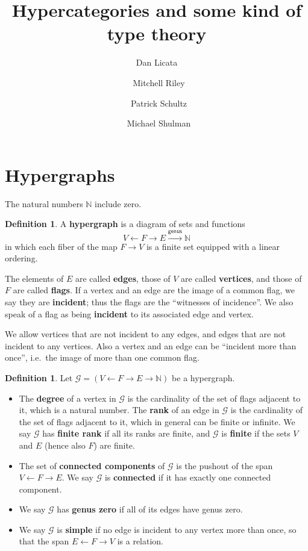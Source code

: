 \documentclass{article}
\title{Hypercategories and some kind of type theory}
\author{Dan Licata \and\ Mitchell Riley \and\ Patrick Schultz \and\ Michael Shulman}
\theoremstyle{definition}
\newtheorem{defn}[thm]{Definition}
\theoremstyle{remark}
\def\G{\mathcal{G}}
\let\ot\leftarrow
\let\xto\xrightarrow
\def\genus{\mathsf{genus}}
\def\N{\mathbb{N}}
\begin{document}
\maketitle

\section{Hypergraphs}
\label{sec:hypergraphs}

The natural numbers $\N$ include zero.

\begin{defn}
  A \textbf{hypergraph} is a diagram of sets and functions
  \[ V \ot F \to E \xto{\genus} \N\]
  in which each fiber of the map $F\to V$ is a finite set equipped with a linear ordering.

  The elements of $E$ are called \textbf{edges}, those of $V$ are called \textbf{vertices}, and those of $F$ are called \textbf{flags}.
  If a vertex and an edge are the image of a common flag, we say they are \textbf{incident}; thus the flags are the ``witnesses of incidence''.
  We also speak of a flag as being \textbf{incident} to its associated edge and vertex.
\end{defn}

We allow vertices that are not incident to any edges, and edges that are not incident to any vertices.
Also a vertex and an edge can be ``incident more than once'', i.e.\ the image of more than one common flag.

\begin{defn}
  Let $\G=(V\ot F\to E\to\N)$ be a hypergraph.
  \begin{itemize}
  \item The \textbf{degree} of a vertex in $\G$ is the cardinality of the set of flags adjacent to it, which is a natural number.
    The \textbf{rank} of an edge in $\G$ is the cardinality of the set of flags adjacent to it, which in general can be finite or infinite.
    We say $\G$ has \textbf{finite rank} if all its ranks are finite, and $\G$ is \textbf{finite} if the sets $V$ and $E$ (hence also $F$) are finite.
  \item The set of \textbf{connected components} of $\G$ is the pushout of the span $V \leftarrow F \to E$.
    We say $\G$ is \textbf{connected} if it has exactly one connected component.
  \item We say $\G$ has \textbf{genus zero} if all of its edges have genus zero.
  \item We say $\G$ is \textbf{simple} if no edge is incident to any vertex more than once, so that the span $E \ot F \to V$ is a relation.
  \end{itemize}
\end{defn}
\end{document}
